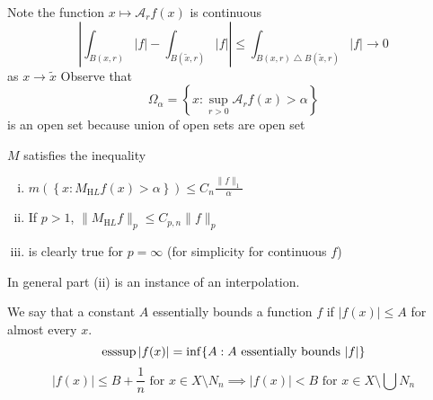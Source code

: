 \begin{remark}
  Note the function
  $x \mapsto \mathcal{A}_r f(x)$ is continuous
  \[\left|\int_{B(x, r)} |f| - \int_{B(\widetilde{x}, r)} |f| \right| \le \int_{B(x, r) \bigtriangleup B(\widetilde{x}, r)} |f| \to 0\]
  as $x \to \widetilde{x}$
  Observe that
  \[\Omega_\alpha = \left\{x : \sup_{r > 0} \mathcal{A}_r f(x) > \alpha\right\}\]
  is an open set because union of open sets are open set
\end{remark}

\begin{theorem}
  $M$ satisfies the inequality
  \begin{enumerate}[(i)]
    \item $m\left(\left\{x : M_{\mathrm HL}f(x) > \alpha\right\}\right) \le C_n \frac{\|f\|_1}{\alpha}$
    \item If $p > 1$, $\|M_{\mathrm HL}f\|_p \le C_{p, n} \|f\|_p$
    \item is clearly true for $p = \infty$ (for simplicity for continuous $f$)
  \end{enumerate}
  In general part (ii) is an instance of an interpolation.
\end{theorem}

We say that a constant $A$ essentially bounds a function $f$ if 
$|f(x)| \le A$ for almost every $x$.
\[\operatorname*{ess sup} |f(x)| = \inf \{A : A \text{ essentially bounds } |f|\}\]
\[|f(x)| \le B + \frac1n \text{ for } x\in X \setminus N_n \implies |f(x)| < B \text{ for } x \in X \setminus \bigcup N_n\]

